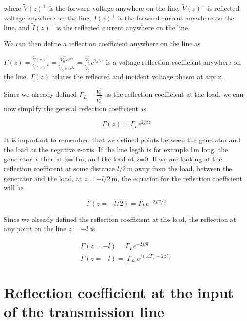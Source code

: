 \documentclass{ximera}
\begin{document}
where $\tilde{V}(z)^+$ is the forward voltage anywhere on the line, $\tilde{V}(z)^-$ is reflected voltage anywhere on the line, $\tilde{I}(z)^+$ is the forward current anywhere on the line, and  $\tilde{I}(z)^-$ is the reflected current anywhere on the line.

We can then define a reflection coefficient anywhere on the line as

\begin{definition}
$\Gamma(z)=\frac{\tilde{V}(z)^-}{\tilde{V}(z)^+} = \frac{\tilde{V}_0^- e^{j \beta z}}{\tilde{V}_0^+ e^{-j \beta z}} = \frac{\tilde{V}_0^-}{\tilde{V}_0^+} e^{2j \beta z} $ is a voltage reflection coefficient anywhere on the line. $\Gamma(z)$ relates the reflected and incident voltage
phasor at any z. 

Since we already defined $\Gamma_L=\frac{\tilde{V}_0^-}{\tilde{V}_0^+}$ as the reflection coefficient at the load, we can now simplify the general reflection coefficient as 

\begin{equation}
\Gamma(z)=\Gamma_L e^{2j \beta z}
\end{equation}

It is important to remember, that we defined points between the generator and the load as the negative z-axis. If the line legth is for example l\,m long, the generator is then at z=-l\,m, and the load at z=0. If we are looking at the reflection coefficient at some distance $l/2$\,m away from the load, between the generator and the load, at $z=-l/2$\,m, the equation for the reflection coefficient will be


\begin{equation}
\Gamma(z=-l/2)=\Gamma_L e^{-2j \beta l/2}
\end{equation}

\end{definition}

Since we already defined the reflection coefficient at the load, the reflection at any point on the line $z=-l$ is


\begin{eqnarray}
\Gamma(z=-l)=\Gamma_L e^{-2j \beta l} \\
\Gamma(z=-l)=|\Gamma_L| e^{j ( \angle \Gamma_L - 2 \beta l) }
\end{eqnarray}



\section{Reflection coefficient at the input of the transmission line}
\end{document}
